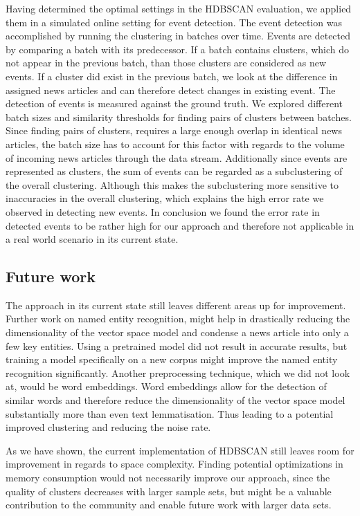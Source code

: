 Having determined the optimal settings in the HDBSCAN evaluation, we applied them in a simulated online setting for event detection. The event detection was accomplished by running the clustering in batches over time. Events are detected by comparing a batch with its predecessor. If a batch contains clusters, which do not appear in the previous batch, than those clusters are considered as new events. If a cluster did exist in the previous batch, we look at the difference in assigned news articles and can therefore detect changes in existing event. The detection of events is measured against the ground truth. We explored different batch sizes and similarity thresholds for finding pairs of clusters between batches. Since finding pairs of clusters, requires a large enough overlap in identical news articles, the batch size has to account for this factor with regards to the volume of incoming news articles through the data stream. Additionally since events are represented as clusters, the sum of events can be regarded as a subclustering of the overall clustering. Although this makes the subclustering more sensitive to inaccuracies in the overall clustering, which explains the high error rate we observed in detecting new events. In conclusion we found the error rate in detected events to be rather high for our approach and therefore not applicable in a real world scenario in its current state. 

\subsection{Future work}

The approach in its current state still leaves different areas up for improvement. Further work on named entity recognition, might help in drastically reducing the dimensionality of the vector space model and condense a news article into only a few key entities. Using a pretrained model did not result in accurate results, but training a model specifically on a new corpus might improve the named entity recognition significantly. Another preprocessing technique, which we did not look at, would be word embeddings. Word embeddings allow for the detection of similar words and therefore reduce the dimensionality of the vector space model substantially more than even text lemmatisation. Thus leading to a potential improved clustering and reducing the noise rate.

As we have shown, the current implementation of HDBSCAN still leaves room for improvement in regards to space complexity. Finding potential optimizations in memory consumption would not necessarily improve our approach, since the quality of clusters decreases with larger sample sets, but might be a valuable contribution to the community and enable future work with larger data sets.

